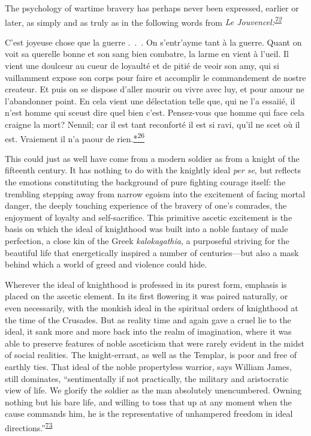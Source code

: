 The psychology of wartime bravery has perhaps never been expressed,
earlier or later, as simply and as truly as in the following words from
\emph{Le
Jouvencel:\textsuperscript{\protect\hypertarget{10_Chapter_Three__THE_HEROIC_DREAM.xhtmlux5cux23id_1790}{\protect\hyperlink{23_NOTES.xhtmlux5cux23id_1791}{72}}}}

C'est joyeuse chose que la guerre .~.~. On s'entr'ayme tant à la guerre.
Quant on voit sa querelle bonne et son sang bien combatre, la larme en
vient à l'ueil. Il vient une doulceur au cueur de loyaulté et de pitié
de veoir son amy, qui si vaillamment expose son corps pour faire et
accomplir le commandement de nostre createur. Et puis on se dispose
d'aller mourir ou vivre avec luy, et pour amour ne l'abandonner point.
En cela vient une délectation telle que, qui ne l'a essaiié, il n'est
homme qui sceust dire quel bien c'est. Pensez-vous que homme qui face
cela craigne la mort? Nennil; car il est tant reconforté il est si ravi,
qu'il ne scet où il est. Vraiement il n'a paour de
rien.\protect\hypertarget{10_Chapter_Three__THE_HEROIC_DREAM.xhtmlux5cux23id_2513}{\protect\hyperlink{23_NOTES.xhtmlux5cux23id_2514}{*\textsuperscript{26}}}

This could just as well have come from a modern soldier as from a knight
of the fifteenth century. It has nothing to do with the knightly ideal
\emph{per se}, but reflects the emotions constituting the background of
pure fighting courage itself: the trembling stepping away from narrow
egoism into the excitement of facing mortal danger, the deeply touching
experience of the bravery of one's comrades,
\protect\hypertarget{10_Chapter_Three__THE_HEROIC_DREAM.xhtmlux5cux23page_82}{}{}the
enjoyment of loyalty and self-sacrifice. This primitive ascetic
excitement is the basis on which the ideal of knighthood was built into
a noble fantasy of male perfection, a close kin of the Greek
\emph{kalokagathia}, a purposeful striving for the beautiful life that
energetically inspired a number of centuries---but also a mask behind
which a world of greed and violence could hide.

Wherever the ideal of knighthood is professed in its purest form,
emphasis is placed on the ascetic element. In its first flowering it was
paired naturally, or even necessarily, with the monkish ideal in the
spiritual orders of knighthood at the time of the Crusades. But as
reality time and again gave a cruel lie to the ideal, it sank more and
more back into the realm of imagination, where it was able to preserve
features of noble asceticism that were rarely evident in the midst of
social realities. The knight-errant, as well as the Templar, is poor and
free of earthly ties. That ideal of the noble propertyless warrior, says
William James, still dominates, ``sentimentally if not practically, the
military and aristocratic view of life. We glorify the soldier as the
man absolutely unencumbered. Owning nothing but his bare life, and
willing to toss that up at any moment when the cause commands him, he is
the representative of unhampered freedom in ideal
directions.''\textsuperscript{\protect\hypertarget{10_Chapter_Three__THE_HEROIC_DREAM.xhtmlux5cux23id_1788}{\protect\hyperlink{23_NOTES.xhtmlux5cux23id_1789}{73}}}

